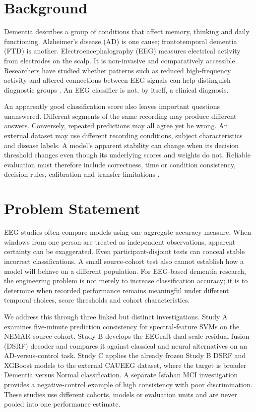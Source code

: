 \section{Background}
Dementia describes a group of conditions that affect memory, thinking and daily functioning. Alzheimer's disease (AD) is one cause; frontotemporal dementia (FTD) is another. Electroencephalography (EEG) measures electrical activity from electrodes on the scalp. It is non-invasive and comparatively accessible. Researchers have studied whether patterns such as reduced high-frequency activity and altered connections between EEG signals can help distinguish diagnostic groups \cite{jeong2004,dauwels2010,cassani2018}. An EEG classifier is not, by itself, a clinical diagnosis.

An apparently good classification score also leaves important questions unanswered. Different segments of the same recording may produce different answers. Conversely, repeated predictions may all agree yet be wrong. An external dataset may use different recording conditions, subject characteristics and disease labels. A model's apparent stability can change when its decision threshold changes even though its underlying scores and weights do not. Reliable evaluation must therefore include correctness, time or condition consistency, decision rules, calibration and transfer limitations \cite{varma2006,varoquaux2018,guo2017calibration}.

\section{Problem Statement}
EEG studies often compare models using one aggregate accuracy measure. When windows from one person are treated as independent observations, apparent certainty can be exaggerated. Even participant-disjoint tests can conceal stable incorrect classifications. A small source-cohort test also cannot establish how a model will behave on a different population. For EEG-based dementia research, the engineering problem is not merely to increase classification accuracy; it is to determine when recorded performance remains meaningful under different temporal choices, score thresholds and cohort characteristics.

We address this through three linked but distinct investigations. Study A examines five-minute prediction consistency for spectral-feature SVMs on the NEMAR source cohort. Study B develops the EEGraft dual-scale residual fusion (DSRF) decoder and compares it against classical and neural alternatives on an AD-versus-control task. Study C applies the already frozen Study B DSRF and XGBoost models to the external CAUEEG dataset, where the target is broader Dementia versus Normal classification. A separate Isfahan MCI investigation provides a negative-control example of high consistency with poor discrimination. These studies use different cohorts, models or evaluation units and are never pooled into one performance estimate.

